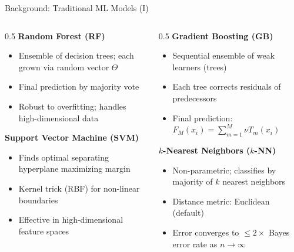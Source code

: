 \documentclass[aspectratio=169]{beamer}
\begin{document}
\begin{frame}{Background: Traditional ML Models (I)}
\begin{columns}[T]
\begin{column}{0.5\textwidth}
\textbf{Random Forest (RF)}
\begin{itemize}
    \item Ensemble of decision trees; each grown via random vector $\Theta$
    \item Final prediction by majority vote
    \item Robust to overfitting; handles high-dimensional data
\end{itemize}

\vspace{0.3cm}
\textbf{Support Vector Machine (SVM)}
\begin{itemize}
    \item Finds optimal separating hyperplane maximizing margin
    \item Kernel trick (RBF) for non-linear boundaries
    \item Effective in high-dimensional feature spaces
\end{itemize}
\end{column}

\begin{column}{0.5\textwidth}
\textbf{Gradient Boosting (GB)}
\begin{itemize}
    \item Sequential ensemble of weak learners (trees)
    \item Each tree corrects residuals of predecessors
    \item Final prediction: $F_M(x_i) = \sum_{m=1}^{M} \nu T_m(x_i)$
\end{itemize}

\vspace{0.3cm}
\textbf{$k$-Nearest Neighbors ($k$-NN)}
\begin{itemize}
    \item Non-parametric; classifies by majority of $k$ nearest neighbors
    \item Distance metric: Euclidean (default)
    \item Error converges to $\leq 2\times$ Bayes error rate as $n \to \infty$
\end{itemize}
\end{column}
\end{columns}
\end{frame}
\end{document}
